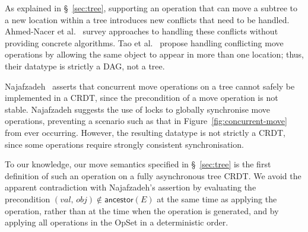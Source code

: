 As explained in \S~\ref{sec:tree}, supporting an operation that can move a subtree to a new location within a tree introduces new conflicts that need to be handled.
Ahmed-Nacer et al.~\cite{AhmedNacer:2012us} survey approaches to handling these conflicts without providing concrete algorithms.
Tao et al.~\cite{Tao:2015gd} propose handling conflicting move operations by allowing the same object to appear in more than one location; thus, their datatype is strictly a DAG, not a tree.

Najafzadeh~\cite{Najafzadeh:2017vk,Najafzadeh:2018bw} asserts that concurrent move operations on a tree cannot safely be implemented in a CRDT, since the precondition of a move operation is not stable.
Najafzadeh suggests the use of locks to globally synchronise move operations, preventing a scenario such as that in Figure~\ref{fig:concurrent-move} from ever occurring.
However, the resulting datatype is not strictly a CRDT, since some operations require strongly consistent synchronisation.

To our knowledge, our move semantics specified in \S~\ref{sec:tree} is the first definition of such an operation on a fully asynchronous tree CRDT.
We avoid the apparent contradiction with Najafzadeh's assertion by evaluating the precondition $(\mathit{val},\, \mathit{obj}) \notin \mathsf{ancestor}(E)$ at the same time as applying the operation, rather than at the time when the operation is generated, and by applying all operations in the OpSet in a deterministic order.
